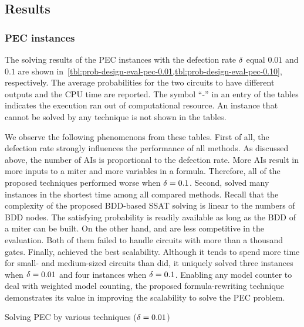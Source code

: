 \subsection{Results}

\subsubsection{PEC instances}
The solving results of the PEC instances with the defection rate $\delta$ equal $0.01$ and $0.1$
are shown in~\cref{tbl:prob-design-eval-pec-0.01,tbl:prob-design-eval-pec-0.10}, respectively.
The average probabilities for the two circuits to have different outputs and the CPU time are reported.
The symbol ``-'' in an entry of the tables indicates the execution ran out of computational resource.
An instance that cannot be solved by any technique is not shown in the tables.

We observe the following phenomenons from these tables.
First of all, the defection rate strongly influences the performance of all methods.
As discussed above, the number of AIs is proportional to the defection rate.
More AIs result in more inputs to a miter and more variables in a formula.
Therefore, all of the proposed techniques performed worse when $\delta=0.1$.
Second, \bddsp solved many instances in the shortest time among all compared methods.
Recall that the complexity of the proposed BDD-based SSAT solving is linear to the numbers of BDD nodes.
The satisfying probability is readily available as long as the BDD of a miter can be built.
On the other hand, \dcssat and \cachet are less competitive in the evaluation.
Both of them failed to handle circuits with more than a thousand gates.
Finally, \approxmc achieved the best scalability.
Although it tends to spend more time for small- and medium-sized circuits than \bddsp did,
it uniquely solved three instances when $\delta=0.01$ and four instances when $\delta=0.1$.
Enabling any model counter to deal with weighted model counting,
the proposed formula-rewriting technique demonstrates its value
in improving the scalability to solve the PEC problem.

\begin{table}[hp]
    \centering
    \footnotesize
    \caption{Solving PEC by various techniques ($\delta=0.01$)}
    \label{tbl:prob-design-eval-pec-0.01}
\end{table}

